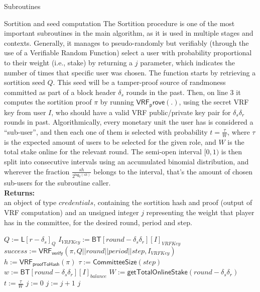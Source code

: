 \documentclass[10pt,a4paper]{article}
\begin{document}
\begin{section}{Subroutines}
\begin{subsection}{Sortition and seed computation}
The Sortition procedure is one of the most important subroutines in the main algorithm, as it is 
used in multiple stages and contexts.
Generally, it manages to pseudo-randomly but verifiably (through the use of a Verifiable Random 
Function) select a user with probability proportional
to their weight (i.e., stake) by returning a $j$ parameter, which indicates the number of times that 
specific user was chosen.
The function starts by retrieving a sortition seed $Q$.
This seed will be a tamper-proof source of randmoness committed as part of a block header $\delta_s$ rounds in
the past.
Then, on line 3 it computes the sortition proof $\pi$ by running $\mathsf{VRF_prove}(.)$, 
using the secret VRF key from user $I$, who should have a valid VRF public/private key pair 
for $\delta_s\delta_r$ rounds in past.
Algorithmically, every monetary unit the user has is considered a ``sub-user'', and then each one 
of them is selected with probability $t = \frac{\tau}{W}$,
where $\tau$ is the expected amount of users to be selected for the given role, and $W$ is the total
stake online for the relevant round.
The semi-open interval $[0,1)$ is then split into consecutive intervals using an accumulated 
binomial distribution, and wherever the fraction $\frac{sh}{2^{\mathsf{log_2}(sh)}}$
belongs to the interval, that's the amount of chosen sub-users for the subroutine caller.\\

\noindent \textbf{Returns:}\\
    an object of type $credentials$, containing the sortition hash and proof (output of VRF
    computation) and an unsigned integer $j$ representing the weight that player has in the committee,
    for the desired round, period and step.



\begin{algorithm}[H]
    \begin{algorithmic}[1]
        \State $Q := \mathsf{L}[r - \delta_s]_{Q}$
        \State $I_{VRFKey} := \mathsf{BT}[round-\delta_s\delta_r][I]_{VRFKey}$
        \State $success := \mathsf{VRF_{verify}}(\pi, Q||round||period||step, I_{VRFKey})$
         \\

        \State $h := \mathsf{VRF_{proofToHash}}(\pi)$
        \State $\tau := \mathsf{CommitteeSize}(step)$
        \State $w := \mathsf{BT}[round-\delta_s\delta_r][I]_{balance}$
        \State $W := \mathsf{getTotalOnlineStake}(round-\delta_s\delta_r)$
        \State $t := \frac{\tau}{W}$
        \State $j := 0$
        \While{$\frac{sh}{2^{\mathsf{log_2}(h)}} \notin [\sum_{k=0}^j\mathsf{B}(k;w,t), \sum_{k=0}^{j+1}\mathsf{B}(k;w,t))$}
            \State $j := j+1$
        \EndWhile
        \Return $j$
    \EndFunction
    \end{algorithmic}
    \caption{\underline{Verify Sortition}}
\end{algorithm}


\end{subsection}
\end{section}
\end{document}
